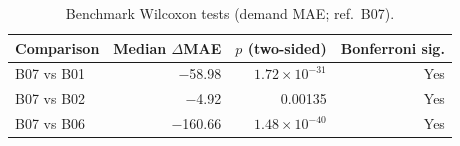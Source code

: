 \begin{table}[!t]
\caption{Benchmark Wilcoxon tests (demand MAE; ref.\ B07).}
\label{tab:4}
\centering
\scriptsize
\renewcommand{\arraystretch}{1.15}
\begin{tabular}{|l|r|r|r|}
\hline
\textbf{Comparison} & \textbf{Median $\Delta$MAE} & \textbf{$p$ (two-sided)} & \textbf{Bonferroni sig.} \\
\hline
B07 vs B01 & $-$58.98 & $1.72\times 10^{-31}$ & Yes \\
B07 vs B02 & $-$4.92 & 0.00135 & Yes \\
B07 vs B06 & $-$160.66 & $1.48\times 10^{-40}$ & Yes \\
\hline
\end{tabular}
\end{table}
